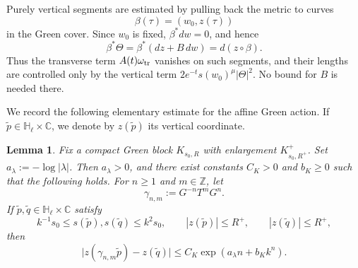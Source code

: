 \documentclass[12pt]{amsart}
\numberwithin{equation}{section}
\newtheorem{lema}{Lemma}
\theoremstyle{remark}
\theoremstyle{definition}
\begin{document}
Purely vertical segments are estimated by pulling back the metric to curves
$$
\beta(\tau)=(w_0,z(\tau))
$$
in the Green cover. Since $w_0$ is fixed, $\beta^*dw=0$, and hence
$$
\beta^*\Theta
=
\beta^*(dz+B\,dw)
=
d(z\circ\beta).
$$
Thus the transverse term $A(t)\omega_{\rm tr}$ vanishes on such segments,
and their lengths are controlled only by the vertical term
$2e^{-t}s(w_0)^\mu|\Theta|^2$. No bound for $B$ is needed there.

We record the following elementary estimate for the affine Green action. If
$\tilde p\in\mathbb{H}_\ell\times\mathbb{C}$, we denote by $z(\tilde p)$ its vertical
coordinate.

\begin{lema}
\label{lem:green-cocycle-growth}
Fix a compact Green block $K_{s_0,R}$ with enlargement
$K^+_{s_0,R^+}$. Set $a_\lambda:=-\log|\lambda|$. Then $a_\lambda>0$, and there exist constants $C_K>0$ and $b_K\geq0$ such that
the following holds. For $n\geq1$ and $m\in\mathbb{Z}$, let
$$
\gamma_{n,m}:=G^{-n}T^mG^n.
$$
If $\tilde p,\tilde q\in\mathbb{H}_\ell\times\mathbb{C}$ satisfy
\begin{equation*}
k^{-1}s_0\leq s(\tilde p),s(\tilde q)\leq k^2s_0,
\qquad
|z(\tilde p)|\leq R^+,\qquad |z(\tilde q)|\leq R^+,
\end{equation*}
then
\begin{equation*}
\bigl|
z(\gamma_{n,m}\tilde p)-z(\tilde q)
\bigr|
\leq
C_K\exp(a_\lambda n+b_Kk^n).
\end{equation*}
\end{lema}
\end{document}
